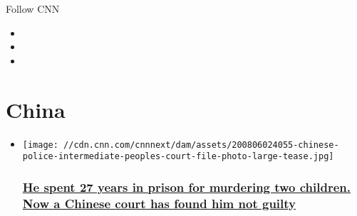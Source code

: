 Follow CNN

\begin{itemize}
\item
\item
\item
\end{itemize}

\hypertarget{china}{%
\section{China}\label{china}}

\begin{itemize}
\item
  \href{/2020/08/06/china/china-homicide-zhang-yuhuan-intl-hnk/index.html}{}

  \texttt{[image: //cdn.cnn.com/cnnnext/dam/assets/200806024055-chinese-police-intermediate-peoples-court-file-photo-large-tease.jpg]}

  \hypertarget{he-spent-27-years-in-prison-for-murdering-two-children-now-a-chinese-court-has-found-him-not-guilty}{%
  \subsubsection{\texorpdfstring{\href{/2020/08/06/china/china-homicide-zhang-yuhuan-intl-hnk/index.html}{He
  spent 27 years in prison for murdering two children. Now a Chinese
  court has found him not
  guilty}}{He spent 27 years in prison for murdering two children. Now a Chinese court has found him not guilty}}\label{he-spent-27-years-in-prison-for-murdering-two-children-now-a-chinese-court-has-found-him-not-guilty}}
\end{itemize}

